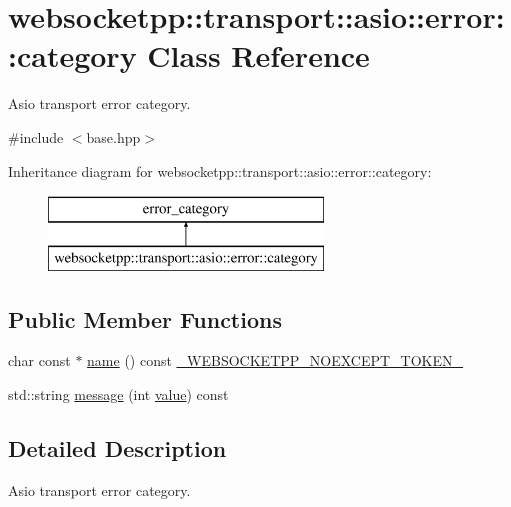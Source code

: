 \hypertarget{classwebsocketpp_1_1transport_1_1asio_1_1error_1_1category}{}\section{websocketpp\+:\+:transport\+:\+:asio\+:\+:error\+:\+:category Class Reference}
\label{classwebsocketpp_1_1transport_1_1asio_1_1error_1_1category}


Asio transport error category.  




{\ttfamily \#include $<$base.\+hpp$>$}

Inheritance diagram for websocketpp\+:\+:transport\+:\+:asio\+:\+:error\+:\+:category\+:\begin{figure}[H]
\begin{center}
\leavevmode
\includegraphics[height=2.000000cm]{classwebsocketpp_1_1transport_1_1asio_1_1error_1_1category}
\end{center}
\end{figure}
\subsection*{Public Member Functions}
\begin{DoxyCompactItemize}
\item 
char const $\ast$ \hyperlink{classwebsocketpp_1_1transport_1_1asio_1_1error_1_1category_af661dabfb4baefe6954d785b3b4fea57}{name} () const \hyperlink{boost__config_8hpp_aa19747404a5f2fe9c9eb9e9d2e48f26c}{\+\_\+\+W\+E\+B\+S\+O\+C\+K\+E\+T\+P\+P\+\_\+\+N\+O\+E\+X\+C\+E\+P\+T\+\_\+\+T\+O\+K\+E\+N\+\_\+}
\item 
std\+::string \hyperlink{classwebsocketpp_1_1transport_1_1asio_1_1error_1_1category_adcf201fda0a1ebf88040eba836f1ba59}{message} (int \hyperlink{namespacewebsocketpp_1_1transport_1_1asio_1_1error_aeb44b27fc0ffac2a8991bf629cbfd045}{value}) const 
\end{DoxyCompactItemize}


\subsection{Detailed Description}
Asio transport error category. 

